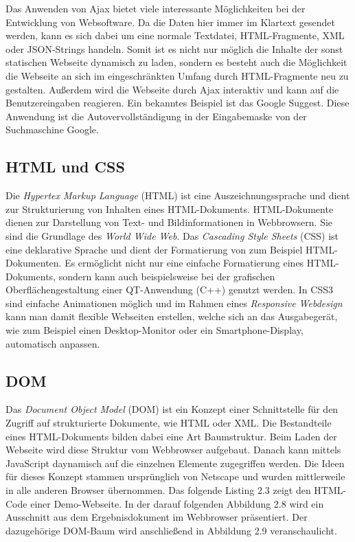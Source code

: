 Das Anwenden von Ajax bietet viele interessante M\"oglichkeiten bei der Entwicklung von Websoftware.
Da die Daten hier immer im Klartext gesendet werden, kann es sich dabei um eine normale Textdatei,
HTML-Fragmente, XML oder JSON-Strings handeln.
Somit ist es nicht nur m\"oglich die Inhalte der sonst statischen Webseite
dynamisch zu laden, sondern es besteht auch die M\"oglichkeit die Webseite an sich im eingeschr\"ankten Umfang durch HTML-Fragmente neu zu gestalten.
Au\ss{}erdem wird die Webseite durch Ajax interaktiv und kann auf die Benutzereingaben reagieren.
Ein bekanntes Beispiel ist das Google Suggest. Diese Anwendung ist die Autovervollst\"andigung in der Eingabemaske von der Suchmaschine Google.\\

\subsection{HTML und CSS}

Die \emph{Hypertex Markup Language}\cite{HTML:01} (HTML) ist eine Auszeichnungssprache und dient zur Strukturierung von Inhalten
eines HTML-Dokuments. HTML-Dokumente dienen zur Darstellung von Text- und Bildinformationen in Webbrowsern.
Sie sind die Grundlage des \emph{World Wide Web}. Das \emph{Cascading Style Sheets}\cite{CSS:01} (CSS) ist eine deklarative Sprache und
dient der Formatierung von zum Beispiel HTML-Dokumenten.
Es erm\"oglicht nicht nur eine einfache Formatierung eines HTML-Dokuments, sondern kann auch beispielsweise bei der grafischen Oberfl\"achengestaltung 
einer QT-Anwendung (C++) genutzt werden.
In CSS3 sind einfache Animationen m\"oglich und im Rahmen eines \emph{Responsive Webdesign}\cite{RWD:01} kann man damit flexible Webseiten erstellen,
welche sich an das Ausgabeger\"at, wie zum Beispiel einen Desktop-Monitor oder ein Smartphone-Display, automatisch anpassen. \\

\subsection{DOM}
Das \emph{Document Object Model}\cite[Kapitel 3]{JavaScript:01} (DOM) ist ein Konzept einer Schnittstelle f\"ur den Zugriff auf
strukturierte Dokumente, wie HTML oder XML. 
Die Bestandteile eines HTML-Dokuments bilden dabei eine Art Baumstruktur.
Beim Laden der Webseite wird diese Struktur vom Webbrowser aufgebaut. 
Danach kann mittels JavaScript daynamisch auf die einzelnen Elemente zugegriffen werden.
Die Ideen f\"ur dieses Konzept stammen urspr\"unglich von Netscape und wurden mittlerweile in alle anderen Browser \"ubernommen.
Das folgende Listing 2.3 zeigt den HTML-Code einer Demo-Webseite. In der darauf folgenden Abbildung 2.8 wird ein Ausschnitt aus dem Ergebnisdokument im 
Webbrowser pr\"asentiert. Der dazugeh\"orige DOM-Baum wird anschlie\ss{}end in Abbildung 2.9 veranschaulicht.\\

